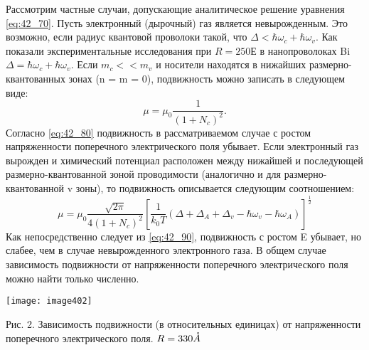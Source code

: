 Рассмотрим частные случаи, допускающие аналитическое решение уравнения \eqref{eq:42_70}. Пусть электронный (дырочный) газ является невырожденным. Это возможно, если радиус квантовой проволоки такой, что $\Delta <\hbar \omega _{c} +\hbar \omega _{v} $. Как показали экспериментальные исследования \cite{Black2003a} при $R=250{\mathrm Е}$ в нанопроволоках Bi $\Delta =\hbar \omega _{c} +\hbar \omega _{v} $. Если $m_{c} <<m_{v} $ и носители находятся в нижайших размерно-квантованных зонах (n = m = 0), подвижность можно записать в следующем виде:
\begin{equation} \label{eq:42_80}
\mu =\mu _{0} \frac{1}{\left(1+N_{c} \right)^{2} } .
\end{equation}
Согласно \eqref{eq:42_80} подвижность в рассматриваемом случае с ростом напряженности поперечного электрического поля убывает. Если электронный газ вырожден и химический потенциал расположен между нижайшей и последующей размерно-квантованной зоной проводимости (аналогично и для размерно-квантованной v зоны), то подвижность описывается следующим соотношением:
\begin{equation} \label{eq:42_90}
\mu =\mu _{0} \frac{\sqrt{2\pi } }{4\left(1+N_{c} \right)^{2} } \left[\frac{1}{k_{0} T} \left(\Delta +\Delta _{A} +\Delta _{v} -\hbar \omega _{v} -\hbar \omega _{A} \right)\right]^{\frac{1}{2} }
\end{equation} 
Как непосредственно следует из \eqref{eq:42_90}, подвижность с ростом E убывает, но слабее, чем в случае невырожденного электронного газа. В общем случае зависимость подвижности от напряженности поперечного электрического поля можно найти только численно.

\noindent \texttt{[image: image402]}

\noindent Рис. 2. Зависимость подвижности (в относительных единицах) от напряженности поперечного электрического поля. $R=330 \AA$

